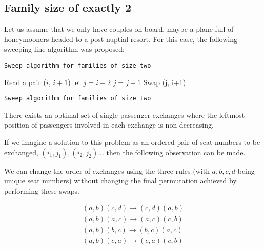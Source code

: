 \subsection{Family size of exactly 2}

\noindent
Let us assume that we only have couples on-board, maybe a plane full of honeymooners headed to a post-nuptial resort. For this case, the following sweeping-line algorithm was proposed:

\begin{algorithm}
\caption{ \texttt{Sweep algorithm for families of size two} }
\label{alg:twoSweep}
  \begin{algorithmic}
  \State Read a pair ($i$, $i+1$) 
   \State let $j = i+2$
      $j = j + 1$
   \EndWhile
   \State Swap (j, i+1)
  \EndIf
\EndWhile
\caption{ \texttt{Sweep algorithm for families of size two} }
\end{algorithmic}
\end{algorithm}
\FloatBarrier

\begin{thm} \label{thm:sweepCorrectness}
There exists an optimal set of single passenger exchanges where the leftmost position of passengers involved in each exchange is non-decreasing.
\end{thm}


If we imagine a solution to this problem as an ordered pair of seat numbers to be exchanged, $(i_1,j_1), (i_2,j_2)...$ then the following observation can be made. 

\begin{lem} \label{lem:swapRules} 
We can change the order of exchanges using the three rules (with $a,b,c,d$ being unique seat numbers) without changing the final permutation achieved by performing these swaps.

\begin{eqnarray*}
(a,b) (c,d) \rightarrow (c,d) (a,b) \\
(a,b) (a,c) \rightarrow (a,c) (c,b) \\
(a,b) (b,c) \rightarrow (b,c) (a,c) \\
(a,b) (c,a) \rightarrow (c,a) (c,b) \\
\end{eqnarray*}
\end{lem}

